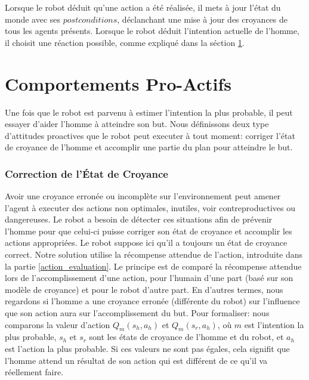\documentclass[a4paper,11pt,twoside]{StyleThese}
\begin{document}
Lorsque le robot déduit qu'une action a été réalisée, il mets à jour l'état du monde avec ses $postconditions$, déclanchant une mise à jour des croyances de tous les agents présents. Lorsque le robot déduit l'intention actuelle de l'homme, il choisit une réaction possible, comme expliqué dans la séction \ref{sec:robot_reaction}.



\section{Comportements Pro-Actifs}
\label{sec:robot_reaction}

Une fois que le robot est parvenu à estimer l'intention la plus probable, il peut essayer d'aider l'homme à atteindre son but. Nous définissons deux type d'attitudes proactives que le robot peut executer à tout moment: corriger l'état de croyance de l'homme et accomplir une partie du plan pour atteindre le but.

\subsubsection{Correction de l'État de Croyance}
Avoir une croyance erronée ou incomplète sur l'environnement peut amener l'agent à executer des actions non optimales, inutiles, voir contreproductives ou dangereuses. Le robot a besoin de détecter ces situations afin de prévenir l'homme pour que celui-ci puisse corriger son état de croyance et accomplir les actions appropriées. Le robot suppose ici qu'il a toujours un état de croyance correct. Notre solution utilise la récompense attendue de l'action, introduite dans la partie \ref{action_evaluation}. Le principe est de comparé la récompense attendue lors de l'accomplissement d'une action, pour l'humain d'une part (basé sur son modèle de croyance) et pour le robot d'autre part. En d'autres termes, nous regardons si l'homme a une croyance erronée (différente du robot) sur l'influence que son action aura sur l'accomplissement du but. Pour formaliser: nous comparons la valeur d'action \(Q_m(s_h,a_h)\) et \(Q_m(s_r,a_h)\), où $m$ est l'intention la plus probable, $s_h$ et $s_r$ sont les états de croyance de l'homme et du robot, et $a_h$ est l'action la plus probable. Si ces valeurs ne sont pas égales, cela signifit que l'homme attend un résultat de son action qui est différent de ce qu'il va réellement faire.
\end{document}
